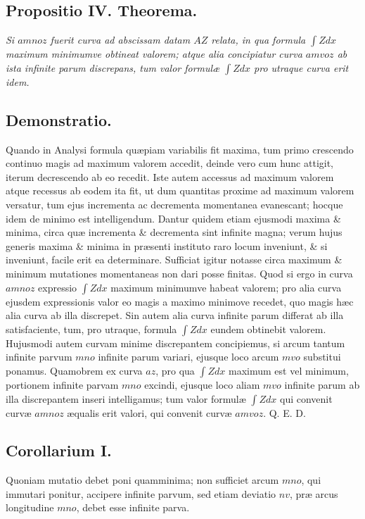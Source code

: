 \subsection*{Propositio IV. Theorema.}
\textit{Si $amnoz$ fuerit curva ad abscissam datam $AZ$ relata, in qua formula $\int Zdx$ maximum minimumve obtineat valorem; atque alia concipiatur curva $amvoz$ ab ista infinite parum discrepans, tum valor formulæ $\int Zdx$ pro utraque curva erit idem.}

\subsection*{Demonstratio.}
Quando in Analysi formula quæpiam variabilis fit maxima, tum primo crescendo continuo magis ad maximum valorem accedit, deinde vero cum hunc attigit, iterum decrescendo ab eo recedit. Iste autem accessus ad maximum valorem atque recessus ab eodem ita fit, ut dum quantitas proxime ad maximum valorem versatur, tum ejus incrementa ac decrementa momentanea evanescant; hocque idem de minimo est intelligendum. Dantur quidem etiam ejusmodi maxima \& minima, circa quæ incrementa \& decrementa sint infinite magna; verum hujus generis maxima \& minima in præsenti instituto raro locum inveniunt, \& si inveniunt, facile erit ea determinare. Sufficiat igitur notasse circa maximum \& minimum mutationes momentaneas non dari posse finitas. Quod si ergo in curva $amnoz$ expressio $\int Zdx$ maximum minimumve habeat valorem; pro alia curva ejusdem expressionis valor eo magis a maximo minimove recedet, quo magis hæc alia curva ab illa discrepet. Sin autem alia curva infinite parum differat ab illa satisfaciente, tum, pro utraque, formula $\int Zdx$ eundem obtinebit valorem. Hujusmodi autem curvam minime discrepantem concipiemus, si arcum tantum infinite parvum $mno$ infinite parum variari, ejusque loco arcum $mvo$ substitui ponamus. Quamobrem ex curva $az$, pro qua $\int Zdx$ maximum est vel minimum, portionem infinite parvam $mno$ excindi, ejusque loco aliam $mvo$ infinite parum ab illa discrepantem inseri intelligamus; tum valor formulæ $\int Zdx$ qui convenit curvæ $amnoz$ æqualis erit valori, qui convenit curvæ $amvoz$. Q. E. D.

\subsection*{Corollarium I.}
Quoniam mutatio debet poni quamminima; non sufficiet arcum $mno$, qui immutari ponitur, accipere infinite parvum, sed etiam deviatio $nv$, præ arcus longitudine $mno$, debet esse infinite parva.

